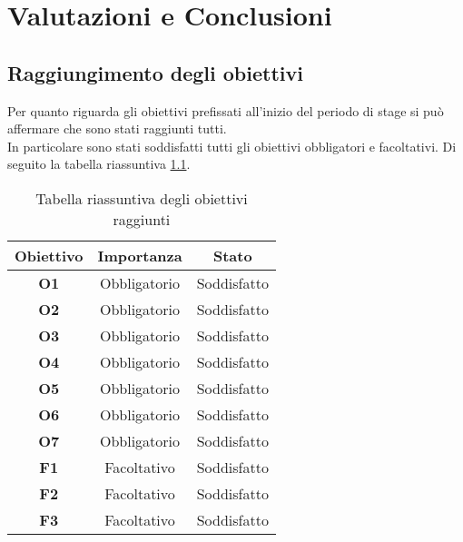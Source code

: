 \chapter{Valutazioni e Conclusioni}
\label{cap:conclusioni}
\section{Raggiungimento degli obiettivi}
Per quanto riguarda gli obiettivi prefissati all'inizio del periodo di stage si può affermare che sono stati raggiunti tutti.\\
In particolare sono stati soddisfatti tutti gli obiettivi obbligatori e facoltativi. Di seguito la tabella riassuntiva \ref{tab:obiettivi_raggiunti}.\\


\begin{table}[h]
    \centering
    \caption{Tabella riassuntiva degli obiettivi raggiunti}
    \label{tab:obiettivi_raggiunti}
    \begin{tabular}{|c|c|c|}
        \hline
        \textbf{Obiettivo} & \textbf{Importanza} & \textbf{Stato} \\\hline
        \textbf{O1} & Obbligatorio & Soddisfatto \\\hline
        \textbf{O2} & Obbligatorio & Soddisfatto\\\hline
        \textbf{O3} & Obbligatorio & Soddisfatto\\\hline
        \textbf{O4} & Obbligatorio & Soddisfatto \\ \hline
        \textbf{O5} & Obbligatorio & Soddisfatto \\\hline
        \textbf{O6} & Obbligatorio & Soddisfatto \\\hline
        \textbf{O7} & Obbligatorio & Soddisfatto \\\hline
        \textbf{F1} & Facoltativo & Soddisfatto\\\hline
        \textbf{F2} & Facoltativo & Soddisfatto \\\hline
        \textbf{F3} & Facoltativo & Soddisfatto\\\hline
    \end{tabular} 
\end{table}

